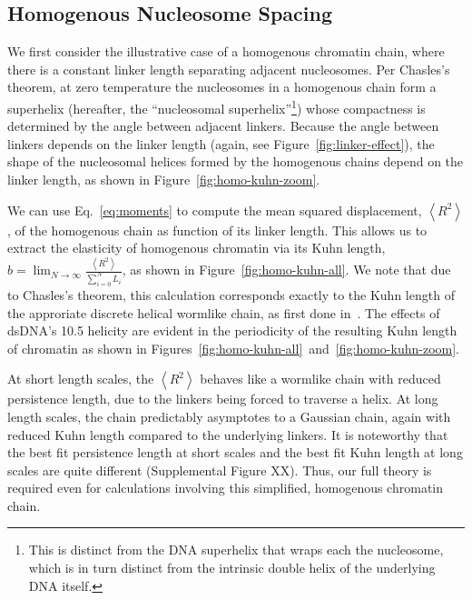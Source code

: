 \documentclass[%
 reprint,
superscriptaddress,
showpacs,preprintnumbers,
 amsmath,amssymb,
 aps,
 prl,
]{revtex4-1}
\newcommand{\RR}{\left\langle{}R^2\right\rangle{}}
\begin{document}
\subsection{\label{sec:homo-kuhn}Homogenous Nucleosome Spacing}

We first consider the illustrative case of a homogenous chromatin chain, where
    there is a constant linker length separating adjacent nucleosomes.
Per Chasles's theorem, at zero temperature the nucleosomes in a homogenous chain
    form a superhelix (hereafter, the ``nucleosomal superhelix''\footnote{%
        This is distinct from the DNA superhelix that wraps each the nucleosome,
        which is in turn distinct from the intrinsic double helix of the
        underlying DNA itself.})
    whose compactness is determined by the angle between adjacent linkers.
Because the angle between linkers depends on the linker length (again, see
    Figure~\ref{fig:linker-effect}), the shape of the nucleosomal helices formed by
    the homogenous chains depend on the linker length, as shown in
    Figure~\ref{fig:homo-kuhn-zoom}.

We can use Eq.~\ref{eq:moments} to compute the mean squared displacement, $\RR$,
    of the homogenous chain as function of its linker length.
This allows us to extract the elasticity of homogenous chromatin via its Kuhn
    length, $b = \lim_{N\to\infty} \frac{\RR}{\sum_{i=0}^N L_i}$, as shown in
    Figure~\ref{fig:homo-kuhn-all}.
We note that due to Chasles's theorem, this calculation corresponds exactly to
    the Kuhn length of the approriate discrete helical wormlike chain, as first
    done in~\cite{yamakawa1976}.
The effects of dsDNA's \SI{10.5}{\basepair} helicity are evident in the
    periodicity of the resulting Kuhn length of chromatin as shown in
    Figures~\ref{fig:homo-kuhn-all}~and~\ref{fig:homo-kuhn-zoom}.

At short length scales, the $\RR$ behaves like a wormlike chain with reduced
    persistence length, due to the linkers being forced to traverse a helix.
At long length scales, the chain predictably asymptotes to a Gaussian
    chain, again with reduced Kuhn length compared to the underlying linkers.
It is noteworthy that the best fit persistence length at short scales and the
    best fit Kuhn length at long scales are quite different (Supplemental Figure
    XX).
Thus, our full theory is required even for calculations involving this
    simplified, homogenous chromatin chain.
\end{document}

